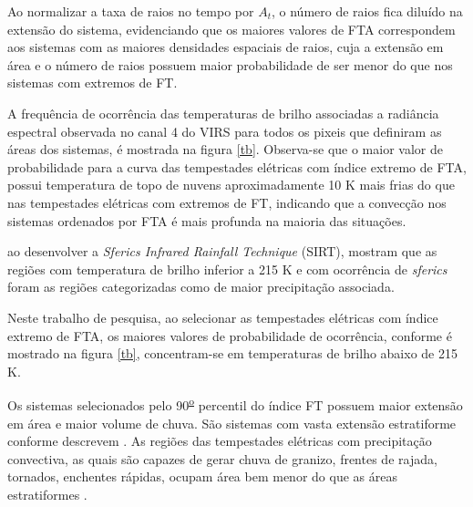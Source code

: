  


Ao normalizar a taxa de raios no tempo por $A_t$, o número de raios fica diluído na extensão do sistema, evidenciando que os maiores valores de FTA correspondem aos sistemas com as maiores densidades espaciais de raios, cuja a extensão em área e o número de raios possuem maior probabilidade de ser menor do que nos sistemas com extremos de FT.

A frequência de ocorrência das temperaturas de brilho associadas a radiância espectral observada no canal 4 do VIRS para todos os pixeis que definiram as áreas dos sistemas, é mostrada na figura \ref{tb}. Observa-se que o maior valor de probabilidade para a curva das tempestades elétricas com índice extremo de FTA, possui temperatura de topo de nuvens aproximadamente 10 K mais frias do que nas tempestades elétricas com extremos de FT, indicando que a convecção nos sistemas ordenados por FTA é mais profunda na maioria das situações.



 ao desenvolver a \textit{Sferics Infrared Rainfall Technique} (SIRT), mostram que as regiões com temperatura de brilho inferior a 215 K e com ocorrência de \textit{sferics} foram as regiões categorizadas como de maior precipitação associada.

Neste trabalho de pesquisa, ao selecionar as tempestades elétricas com índice extremo de FTA, os maiores valores de probabilidade de ocorrência, conforme é mostrado na figura \ref{tb}, concentram-se em temperaturas de brilho abaixo de 215 K.

Os sistemas selecionados pelo 90\textsuperscript{\underline{o}} percentil do índice FT possuem maior extensão em área e maior volume de chuva. São sistemas com vasta extensão estratiforme conforme descrevem . As regiões das tempestades elétricas com precipitação convectiva, as quais são capazes de gerar chuva de granizo, frentes de rajada, tornados, enchentes rápidas, ocupam área bem menor do que as áreas estratiformes \cite{Jr2007}.

